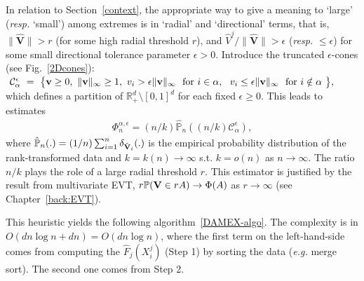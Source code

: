 In relation to Section~\ref{context}, the appropriate way to
give a meaning to `large' (\emph{resp.} `small') among extremes is in
`radial' and `directional' terms, that is, $\| \mathbf{\hat V}\|>r$ (for some
high radial threshold $r$), and $\hat V^j/\|\mathbf{\hat V}\| >\epsilon$
(\emph{resp.} $ \le \epsilon$) for some small directional tolerance
parameter 
$\epsilon>0$.
Introduce the truncated $\epsilon$-cones (see Fig.~\ref{2Dcones}):
$ ~\mathcal{C}_\alpha^\epsilon~=~\big\{\mathbf v \ge 0,~\|\mathbf v\|_\infty \ge 1,~ v_i > \epsilon \|\mathbf v\|_\infty ~\text{ for } i
 \in \alpha, ~~v_i \le \epsilon\|\mathbf v\|_\infty ~\text{ for } i \notin \alpha~ \big\},$
which defines a
partition of $\mathbb{R}_+^{d}\setminus [0,1]^d$ for each fixed $\epsilon\ge 0$.
This leads to  estimates %
\begin{align}
\label{mu_n}
\Phi_n^{\alpha, \epsilon} = (n/k) \mathbb{\hat P}_n \left (  (n/k) \mathcal{C}_\alpha^\epsilon \right), 
\end{align}
\noindent
where $\mathbb{\hat P}_n(.)=(1/n)\sum_{i=1}^n\delta_{\hat{\mathbf V}_i}(.)$ is the empirical probability distribution of the rank-transformed data and $k =
k(n) \to \infty$ s.t. $k = o(n)$ as $n \to
\infty$. %
The ratio $n/k$ plays the role of a large radial
threshold $r$. 
This estimator is justified by the result from multivariate EVT, $r \mathbb{P}(\mathbf V \in r A) \to \Phi(A)$ as $r \to \infty$ (see Chapter~\ref{back:EVT}).
%

This heuristic yields the following algorithm~\ref{DAMEX-algo}.
The complexity is in $O( dn\log n + dn) = O(dn\log n)$, where the first term on the left-hand-side comes from  computing the $\hat F_j(X_i^j)$ (Step 1) by sorting  the data
(\emph{e.g.} merge sort). The second one comes from Step 2. 

